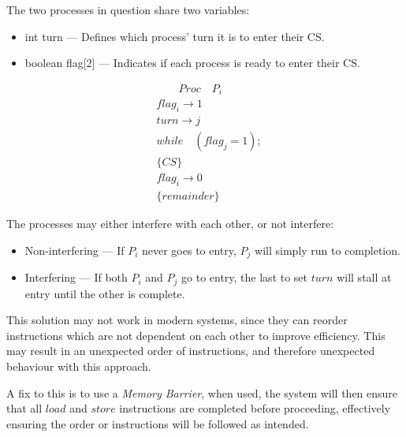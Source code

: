 The two processes in question share two variables:
\begin{itemize}
    \item int turn --- Defines which process' turn it is to enter their CS.
    \item boolean flag[2] --- Indicates if each process is ready to enter their CS.
\end{itemize}

\begin{equation}
    \begin{split}
        &\quad\quad Proc\quad P_i \\
        &flag_i\to 1 \\
        &turn\to j \\
        &while\quad(flag_j=1); \\
        &\{CS\} \\
        &flag_i\to 0 \\
        &\{remainder\}
    \end{split}
\end{equation}

The processes may either interfere with each other, or not interfere:
\begin{itemize}
    \item Non-interfering --- If $P_i$ never goes to entry, $P_j$ will simply run to completion.
    \item Interfering --- If both $P_i$ and $P_j$ go to entry, the last to set $turn$ will stall at entry until the other is complete.
\end{itemize}

This solution may not work in modern systems, since they can reorder instructions which are not
dependent on each other to improve efficiency. This may result in an unexpected order of instructions,
and therefore unexpected behaviour with this approach.

A fix to this is to use a \textit{Memory Barrier}, when used, the system will then ensure that all $load$
and $store$ instructions are completed before proceeding, effectively ensuring the order or instructions will be
followed as intended.